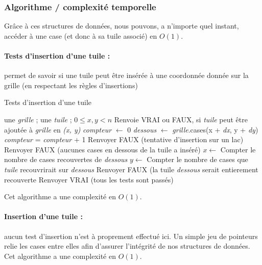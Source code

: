 \documentclass[10pt]{article}
\begin{document}
			\newpage
			\subsubsection{Algorithme / complexité temporelle}
			
				Grâce à ces structures de données, nous pouvons, a n'importe quel instant, accéder à une case (et donc à sa tuile associé) en $O(1)$.
				
				\paragraph{Tests d'insertion d'une tuile :}
					permet de savoir si une tuile peut être insérée à une coordonnée donnée sur la grille (en respectant les règles d'insertions)
						\begin{algorithm}
							\caption{Tests d'insertion d'une tuile}
							\begin{algorithmic}
								\REQUIRE une \textit{grille} ; une \textit{tuile} ; $0 \leq x, y < n$
								\ENSURE Renvoie VRAI ou FAUX, si \textit{tuile} peut être ajoutée à \textit{grille} en \textit{(x, y)}
								\STATE \textit{compteur} $\leftarrow$ 0
									\STATE \textit{dessous} $\leftarrow$ \textit{grille}.cases(x + \textit{dx}, y + \textit{dy})
										\STATE \textit{compteur} = \textit{compteur} + 1
											\STATE Renvoyer FAUX (tentative d'insertion sur un lac)
										\ENDIF
									\ENDIF
										\STATE Renvoyer FAUX (aucunes cases en dessous de la tuile a inséré)
									\ENDIF
								\ENDFOR
									\STATE $x \leftarrow$ Compter le nombre de cases recouvertes de \textit{dessous}
									\STATE $y \leftarrow$ Compter le nombre de cases que \textit{tuile} recouvrirait sur \textit{dessous}
										\STATE Renvoyer FAUX (la tuile \textit{dessous} serait entierement recouverte
									\ENDIF
								\ENDFOR
								\STATE Renvoyer VRAI (tous les tests sont passés)
							\end{algorithmic}
						\end{algorithm}
						Cet algorithme a une complexité en $O(1)$.

				\newpage
				\paragraph{Insertion d'une tuile :}
					aucun test d'insertion n'est à proprement effectué ici. Un simple jeu de pointeurs relie les cases entre elles
					afin d'assurer l'intégrité de nos structures de données. Cet algorithme a une complexité en $O(1)$.
					
\end{document}
